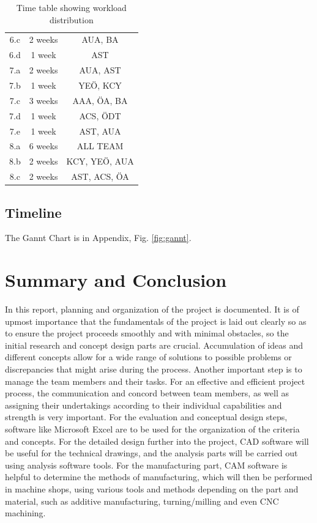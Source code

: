 \documentclass[12pt]{report}
\begin{document}
\begin{table}[h!]
\begin{minipage}{0.45\textwidth}
\begin{tabular}{|c|c|c|}
    6.c & 2 weeks & AUA, BA \\
    6.d & 1 week & AST \\
    7.a & 2 weeks & AUA, AST \\
    7.b & 1 week & YEÖ, KCY \\
    7.c & 3 weeks & AAA, ÖA, BA \\
    7.d & 1 week & ACS, ÖDT \\
    7.e & 1 week & AST, AUA \\
    8.a & 6 weeks & ALL TEAM \\
    8.b & 2 weeks & KCY, YEÖ, AUA \\
    8.c & 2 weeks & AST, ACS, ÖA \\
    \hline
    \end{tabular}
\end{minipage}
    \caption{Time table showing workload distribution}
\end{table}

\subsection{Timeline}
The Gannt Chart is in Appendix, Fig. \ref{fig:gannt}.

\section{Summary and Conclusion}
In this report, planning and organization of the project is documented. It is of upmost importance that the fundamentals of the project is laid out clearly so as to ensure the project proceeds smoothly and with minimal obstacles, so the initial research and concept design parts are crucial. Accumulation of ideas and different concepts allow for a wide range of solutions to possible problems or discrepancies that might arise during the process. Another important step is to manage the team members and their tasks. For an effective and efficient project process, the communication and concord between team members, as well as assigning their undertakings according to their individual capabilities and strength is very important.
For the evaluation and conceptual design steps, software like Microsoft Excel are to be used for the organization of the criteria and concepts. For the detailed design further into the project, CAD software will be useful for the technical drawings, and the analysis parts will be carried out using analysis software tools. For the manufacturing part, CAM software is helpful to determine the methods of manufacturing, which will then be performed in machine shops, using various tools and methods depending on the part and material, such as additive manufacturing, turning/milling and even CNC machining.
\end{document}
